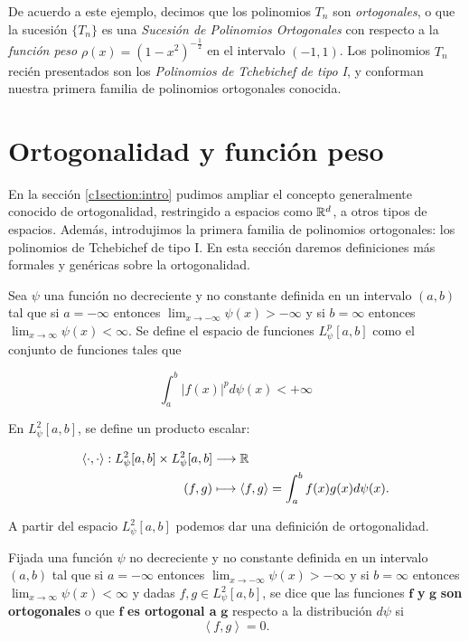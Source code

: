 De acuerdo a este ejemplo, decimos que los polinomios $T_n$ son \textit{ortogonales}, o que la sucesión $\{T_n\}$ es una \textit{Sucesión de Polinomios Ortogonales} con respecto a la \textit{función peso} $\rho(x)=(1-x^2)^{-\frac 1 2}$ en el intervalo $(-1,1)$. Los polinomios $T_n$ recién presentados son los \textit{Polinomios de Tchebichef de tipo I}, y conforman nuestra primera familia de polinomios ortogonales conocida.

\section{Ortogonalidad y función peso}
\label{c1section:ort-peso}

En la sección \ref{c1section:intro} pudimos ampliar el concepto generalmente conocido de ortogonalidad, restringido a espacios como $\mathbb{R}^d$, a otros tipos de espacios. Además, introdujimos la primera familia de polinomios ortogonales: los polinomios de Tchebichef de tipo I. En esta sección daremos definiciones más formales y genéricas sobre la ortogonalidad.

Sea $\psi$ una función no decreciente y no constante definida en un intervalo $(a,b)$ tal que si $a=-\infty$ entonces $\displaystyle\lim_{x\rightarrow-\infty}\psi(x)>-\infty$ y si $b=\infty$ entonces $\displaystyle\lim_{x\rightarrow\infty}\psi(x)<\infty$. Se define el espacio de funciones $L_\psi^p[a,b]$ como el conjunto de funciones tales que

$$
\int_a^b |f(x)|^p d\psi(x) < +\infty
$$

En $L_\psi^2[a,b]$, se define un producto escalar:

\begin{equation}
    \label{eq:prodescLpalpha}
    \begin{split}
        \left\langle\cdot,\cdot\right\rangle:L_\psi^2[a,b]\times L_\psi^2[a,b] &\longrightarrow \mathbb{R} \\
        (f,g)&\longmapsto \left\langle f,g \right\rangle=\int_a^b f(x)g(x)d\psi(x).
    \end{split}
\end{equation}

A partir del espacio $L_\psi^2[a,b]$ podemos dar una definición de ortogonalidad.

\begin{definicion}[Ortogonalidad]

    Fijada una función $\psi$ no decreciente y no constante definida en un intervalo $(a,b)$ tal que si $a=-\infty$ entonces $\displaystyle\lim_{x\rightarrow-\infty}\psi(x)>-\infty$ y si $b=\infty$ entonces $\displaystyle\lim_{x\rightarrow\infty}\psi(x)<\infty$ y dadas $f,g\in L_\psi^2[a,b]$, se dice que las funciones $\mathbf f$ \textbf y $\mathbf g$ \textbf{son ortogonales} o que $\mathbf f$ \textbf{es ortogonal a} $\mathbf{g}$ respecto a la distribución $d\psi$ si
    \begin{equation}
        \label{eq:defortogonalidad}
        \left\langle f,g\right\rangle = 0.
    \end{equation}
\end{definicion}

